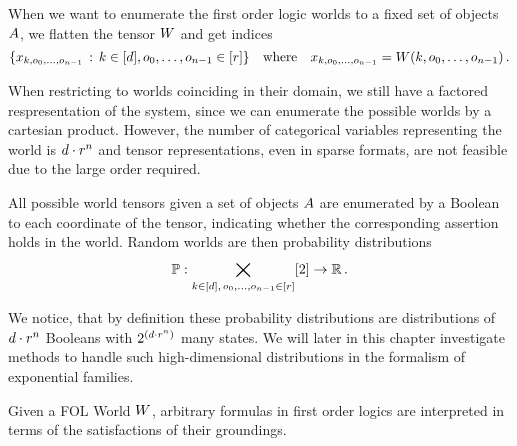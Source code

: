 When we want to enumerate the first order logic worlds to a fixed set of objects $A$, we flatten the tensor $W$ and get indices 
	\[ \{x_{k,o_{0},\ldots,o_{n-1}} \, : \, k\in[d], o_{0},\ldots,o_{n-1} \in[r] \} \quad 
	\text{where} \quad x_{k,o_{0},\ldots,o_{n-1}} = W(k,o_{0},\ldots,o_{n-1}) \, .  \]


When restricting to worlds coinciding in their domain, we still have a factored respresentation of the system, since we can enumerate the possible worlds by a cartesian product.
However, the number of categorical variables representing the world is $d\cdot r^{n}$ and tensor representations, even in sparse formats, are not feasible due to the large order required.





All possible world tensors given a set of objects $A$ are enumerated by a Boolean to each coordinate of the tensor, indicating whether the corresponding assertion holds in the world.
Random worlds are then probability distributions
\begin{align*}
	\mathbb{P} : \bigtimes_{k\in[d], \, o_{0},\ldots,o_{n-1} \in[r]} [2] \rightarrow \mathbb{R} \, . 
\end{align*}

We notice, that by definition these probability distributions are distributions of $d\cdot r^{n}$ Booleans with $2^{\left(d\cdot r^{n}\right)}$ many states.
We will later in this chapter investigate methods to handle such high-dimensional distributions in the formalism of exponential families.





Given a FOL World $W$, arbitrary formulas in first order logics are interpreted in terms of the satisfactions of their groundings.

